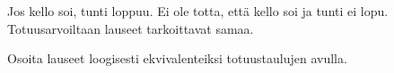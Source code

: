 \begin{tehtavasivu}
\begin{tehtava}
    \begin{vastaus}
    
       Jos kello soi, tunti loppuu. \newline
       Ei ole totta, että kello soi ja tunti ei lopu. \newline
       Totuusarvoiltaan lauseet tarkoittavat samaa.
    \end{vastaus}
    
\end{tehtava}

\begin{tehtava}
     Osoita lauseet loogisesti ekvivalenteiksi
totuustaulujen avulla.
    \begin{alakohdat}
    \end{alakohdat}

    \begin{vastaus}
    

\end{vastaus}
\end{tehtava}
\end{tehtavasivu}
